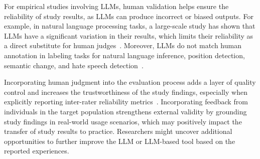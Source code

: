 

For empirical studies involving LLMs, human validation helps ensure the reliability of study results, as LLMs can produce incorrect or biased outputs.
For example, in natural language processing tasks, a large-scale study has shown that LLMs have a significant variation in their results, which limits their reliability as a direct substitute for human judges~\cite{DBLP:journals/corr/abs-2406-18403}. 
Moreover, LLMs do not match human annotation in labeling tasks for natural language inference, position detection, semantic change, and hate speech detection~\cite{DBLP:conf/chi/Wang0RMM24}.

Incorporating human judgment into the evaluation process adds a layer of quality control and increases the trustworthiness of the study findings, especially when explicitly reporting inter-rater reliability metrics~\cite{khraisha2024canlargelanguagemodelshumans}.
Incorporating feedback from individuals in the target population strengthens external validity by grounding study findings in real-world usage scenarios, which may positively impact the transfer of study results to practice.
Researchers might uncover additional opportunities to further improve the LLM or LLM-based tool based on the reported experiences.


